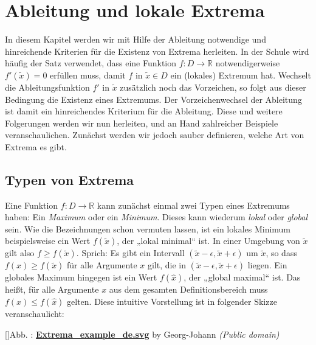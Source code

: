 \documentclass[fontsize=9pt,
               parskip=half-,
               DIV=14,
               listof=chapterentry,
               tocflat]{scrbook}
\newcounter{imagelabel}
\begin{document}
\chapter{Ableitung und lokale Extrema}

In diesem Kapitel werden wir mit Hilfe der Ableitung notwendige und hinreichende Kriterien für die Existenz von Extrema herleiten. In der Schule wird häufig der Satz verwendet, dass eine Funktion $f:D\to \mathbb {R} $ notwendigerweise $f'({\tilde {x}})=0$ erfüllen muss, damit $f$ in ${\tilde {x}}\in D$ ein (lokales) Extremum hat. Wechselt die Ableitungsfunktion $f'$ in ${\tilde {x}}$ zusätzlich noch das Vorzeichen, so folgt aus dieser Bedingung die Existenz eines Extremums. Der Vorzeichenwechsel der Ableitung ist damit ein hinreichendes Kriterium für die Ableitung. Diese und weitere Folgerungen werden wir nun herleiten, und an Hand zahlreicher Beispiele veranschaulichen. Zunächst werden wir jedoch sauber definieren, welche Art von Extrema es gibt.

\section{Typen von Extrema}

Eine Funktion $f:D\to \mathbb {R} $ kann zunächst einmal zwei Typen eines Extremums haben: Ein \emph{Maximum} oder ein \emph{Minimum}. Dieses kann wiederum \emph{lokal} oder \emph{global} sein. Wie die Bezeichnungen schon vermuten lassen, ist ein lokales Minimum beispielsweise ein Wert $f({\tilde {x}})$, der „lokal minimal“ ist. In einer Umgebung von ${\tilde {x}}$ gilt also $f\geq f({\tilde {x}})$. Sprich: Es gibt ein Intervall $({\tilde {x}}-\epsilon ,{\tilde {x}}+\epsilon )$ um ${\tilde {x}}$, so dass $f(x)\geq f({\tilde {x}})$ für alle Argumente $x$ gilt, die in $({\tilde {x}}-\epsilon ,{\tilde {x}}+\epsilon )$ liegen. Ein globales Maximum hingegen ist ein Wert $f({\hat {x}})$, der „global maximal“ ist. Das heißt, für alle Argumente $x$ aus dem gesamten Definitionsbereich muss $f(x)\leq f({\hat {x}})$ gelten. Diese intuitive Vorstellung ist in folgender Skizze veranschaulicht:

[]{Abb. : \protect\href{https://commons.wikimedia.org/wiki/File:Extrema_example_de.svg}{\textbf{Extrema\allowbreak\_example\allowbreak\_de.svg}} by Georg-Johann \textit{(Public domain)}}\begin{center}
\end{center}
\end{document}
